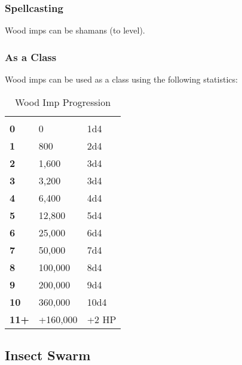 \begin{multicols*}{2}
\subsubsection{Spellcasting}
Wood imps can be shamans (to  level).

\subsubsection{As a Class}
Wood imps can be used as a class using the following statistics:


\begin {table}[H]
  \caption{Wood Imp Progression}
  \begin{tabularx}{\columnwidth}{>{\bfseries}YYY}
		 &  & \\
	0 & 0 & 1d4\\
	1 & 800 & 2d4\\
	2 & 1,600 & 3d4\\
	3 & 3,200 & 3d4\\
	4 & 6,400 & 4d4\\
	5 & 12,800 & 5d4\\
	6 & 25,000 & 6d4\\
	7 & 50,000 & 7d4\\
	8 & 100,000 & 8d4\\
	9 & 200,000 & 9d4\\
	10 & 360,000 & 10d4\\
	11+ & +160,000 & +2 HP
  \end {tabularx}
\end {table}

\subsection{Insect Swarm}
\end{multicols*}
